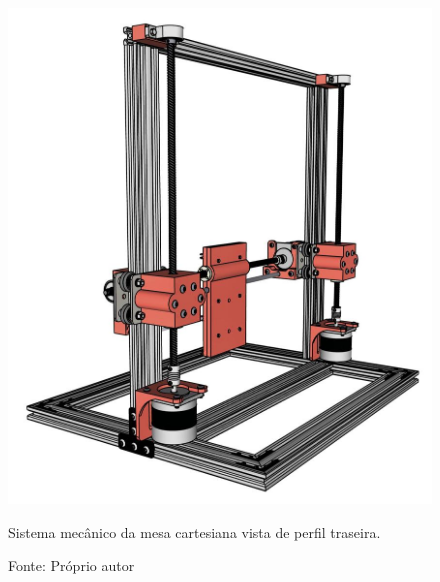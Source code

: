 \begin{figure}[H]
\centering
\includegraphics[scale = 0.35]{figuras/mesacartesianaperfiltraseira}
\caption{Sistema mecânico da mesa cartesiana vista de perfil traseira.}
\caption*{Fonte: Próprio autor}
\label{fig:mesacartesianaperfiltraseira}
\end{figure}
        

